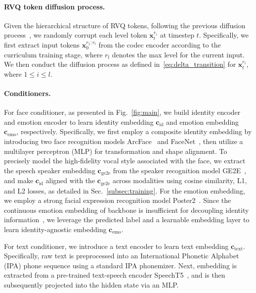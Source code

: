 \paragraph{RVQ token diffusion process.~~\xspace}
Given the hierarchical structure of RVQ tokens, following the previous diffusion process~\cite{SEDD:conf/icml/LouME24}, we randomly corrupt each level token $\bm{x}^{r_i}_t$ at timestep $t$. 
Specifically, we first extract input tokens  $\bm{x}^{r_1:r_l}_0$ from the codec encoder according to the curriculum training stage, where $r_l$ denotes the max level for the current input. We then conduct the diffusion process as defined in~\cref{eq:delta_transition} for $\bm{x}^{r_i}_t$, where $1\leq i\leq l$. 


\paragraph{Conditioners.~~\xspace} 
For face conditioner, as presented in Fig.~\ref{fig:main}, we build identity encoder and emotion encoder to learn identity embedding  $\bm{c}_\text{id}$ and emotion embedding $\bm{c}_\text{emo}$, respectively. 
Specifically, we first employ a composite identity embedding by introducing two face recognition models ArcFace~\cite{arcface:journals/pami/DengGYXKZ22} and FaceNet~\cite{facenet:conf/cvpr/SchroffKP15}, then utilize a multilayer perceptron (MLP) for transformation and shape alignment. 
To precisely model the high-fidelity vocal style associated with the face, we extract the speech speaker embedding $\bm{c}_\text{ge2e}$ from the speaker recognition model GE2E~\cite{GE2E/WanWPL18}, and make $\bm{c}_\text{id}$ aligned with the $\bm{c}_\text{ge2e}$ across modalities using cosine similarity, L1, and L2 losses, as detailed in Sec.~\ref{subsec:training}. 
For the emotion embedding, we employ a strong facial expression recognition model Poster2~\cite{posterv2:journals/corr/abs-2301-12149}. Since the continuous emotion embedding of backbone is insufficient for decoupling identity information~\cite{DBLP:conf/cvpr/LiuM0HFL0C24}, we leverage the predicted label and a learnable embedding layer to learn identity-agnostic embedding $\bm{c}_\text{emo}$. 

For text conditioner, we introduce a text encoder to learn text embedding $\bm{c}_\text{text}$. Specifically, raw text is preprocessed into an International Phonetic Alphabet (IPA) phone sequence using a standard IPA phonemizer. Next, embedding is extracted from a pre-trained text-speech encoder SpeechT5~\cite{speecht5:conf/acl/AoWZ0RW0KLZWQ0W22}, and is then subsequently projected into the hidden state via an MLP. 


